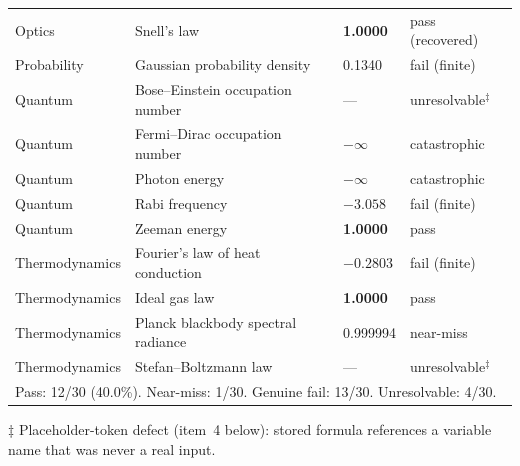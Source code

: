 \documentclass[11pt]{article}
\begin{document}
\begin{longtable}{p{2.3cm}p{6.2cm}p{1.5cm}p{2.5cm}}
Optics & Snell's law & \textbf{1.0000} & pass (recovered) \\
Probability & Gaussian probability density & 0.1340 & fail (finite) \\
Quantum & Bose--Einstein occupation number & --- & unresolvable$^\ddagger$ \\
Quantum & Fermi--Dirac occupation number & $-\infty$ & catastrophic \\
Quantum & Photon energy & $-\infty$ & catastrophic \\
Quantum & Rabi frequency & $-3.058$ & fail (finite) \\
Quantum & Zeeman energy & \textbf{1.0000} & pass \\
Thermodynamics & Fourier's law of heat conduction & $-0.2803$ & fail (finite) \\
Thermodynamics & Ideal gas law & \textbf{1.0000} & pass \\
Thermodynamics & Planck blackbody spectral radiance & 0.999994 & near-miss \\
Thermodynamics & Stefan--Boltzmann law & --- & unresolvable$^\ddagger$ \\
\midrule
\multicolumn{4}{l}{Pass: 12/30 (40.0\%). Near-miss: 1/30. Genuine fail: 13/30. Unresolvable: 4/30.} \\
\bottomrule
\end{longtable}

$\ddagger$ Placeholder-token defect (item~4 below): stored formula
references a variable name that was never a real input.

\bigskip
\end{document}
